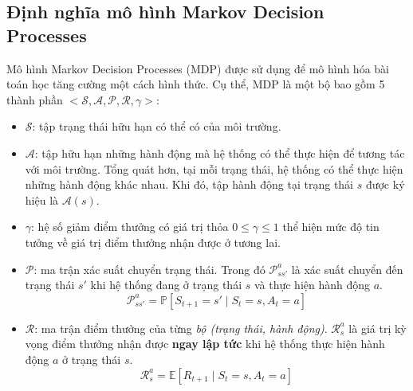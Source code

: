 \subsection{Định nghĩa mô hình Markov Decision Processes}
Mô hình Markov Decision Processes (MDP) được sử dụng để mô hình hóa bài toán học tăng cường một cách hình thức. 
Cụ thể, MDP là một bộ bao gồm 5 thành phần $<\mathcal{S, A, P, R, \gamma}>$:
\begin{itemize}
	\item $\mathcal{S}$: tập trạng thái hữu hạn có thể có của môi trường.
	\item $\mathcal{A}$: tập hữu hạn những hành động mà hệ thống có thể thực hiện để tương tác với môi trường.
	Tổng quát hơn, tại mỗi trạng thái, hệ thống có thể thực hiện những hành động khác nhau.
	Khi đó, tập hành động tại trạng thái $s$ được ký hiệu là $\mathcal{A}(s)$.
	\item $\gamma$: hệ số giảm điểm thưởng có giá trị thỏa $0\leqslant \gamma \leqslant 1$ thể hiện mức độ tin tưởng về giá trị điểm thưởng nhận được ở tương lai.
	\item $\mathcal{P}$: ma trận xác suất chuyển trạng thái. 
	Trong đó $\mathcal{P}_{ss'}^{a}$ là xác suất chuyển đến trạng thái $s'$ khi hệ thống đang ở trạng thái $s$ và thực hiện hành động $a$.
	\begin{equation}
	\mathcal{P}_{ss'}^{a} = \mathbb{P}[\mathit{S_{t+1}} = s' \mid \mathit{S_{t}} = s, \mathit{A_{t}} = a]
	\end{equation}
	\item $\mathcal{R}$: ma trận điểm thưởng của từng \textit{bộ (trạng thái, hành động)}. 
	$\mathcal{R}_{s}^a$ là giá trị kỳ vọng điểm thưởng nhận được \textbf{ngay lập tức} khi hệ thống thực hiện hành động $a$ ở trạng thái $s$.
	\begin{equation}
	\mathcal{R}_{s}^a = \mathbb{E}[\mathit{R_{t+1}} \mid \mathit{S_{t}} = s, \mathit{A_{t}} = a]
	\end{equation}				
\end{itemize}

